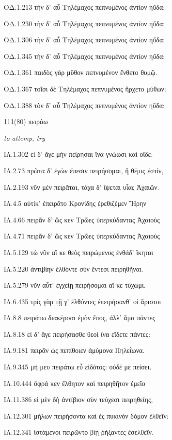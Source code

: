 \begin{enumerate}
{ΟΔ.1.213 τὴν δ' αὖ Τηλέμαχος πεπνυμένος ἀντίον ηὔδα:

ΟΔ.1.230 τὴν δ' αὖ Τηλέμαχος πεπνυμένος ἀντίον ηὔδα:

ΟΔ.1.306 τὴν δ' αὖ Τηλέμαχος πεπνυμένος ἀντίον ηὔδα:

ΟΔ.1.345 τὴν δ' αὖ Τηλέμαχος πεπνυμένος ἀντίον ηὔδα:

ΟΔ.1.361 παιδὸς γὰρ μῦθον πεπνυμένον ἔνθετο θυμῷ.

ΟΔ.1.367 τοῖσι δὲ Τηλέμαχος πεπνυμένος ἤρχετο μύθων:

ΟΔ.1.388 τὸν δ' αὖ Τηλέμαχος πεπνυμένος ἀντίον ηὔδα:

}

\clearpage
\item[\large 111(80)]{\large \g πειράω}

\hspace{0.2cm} \textit{ to attemp, try }

{\g
ΙΛ.1.302 εἰ δ' ἄγε μὴν πείρησαι ἵνα γνώωσι καὶ οἵδε:

ΙΛ.2.73 πρῶτα δ' ἐγὼν ἔπεσιν πειρήσομαι, ἣ θέμις ἐστίν,

ΙΛ.2.193 νῦν μὲν πειρᾶται, τάχα δ' ἴψεται υἷας Ἀχαιῶν.

ΙΛ.4.5 αὐτίκ' ἐπειρᾶτο Κρονίδης ἐρεθιζέμεν Ἥρην

ΙΛ.4.66 πειρᾶν δ' ὥς κεν Τρῶες ὑπερκύδαντας Ἀχαιοὺς

ΙΛ.4.71 πειρᾶν δ' ὥς κεν Τρῶες ὑπερκύδαντας Ἀχαιοὺς

ΙΛ.5.129 τὼ νῦν αἴ κε θεὸς πειρώμενος ἐνθάδ' ἵκηται

ΙΛ.5.220 ἀντιβίην ἐλθόντε σὺν ἔντεσι πειρηθῆναι.

ΙΛ.5.279 νῦν αὖτ' ἐγχείῃ πειρήσομαι αἴ κε τύχωμι.

ΙΛ.6.435 τρὶς γὰρ τῇ γ' ἐλθόντες ἐπειρήσανθ' οἱ ἄριστοι

ΙΛ.8.8 πειράτω διακέρσαι ἐμὸν ἔπος, ἀλλ' ἅμα πάντες

ΙΛ.8.18 εἰ δ' ἄγε πειρήσασθε θεοὶ ἵνα εἴδετε πάντες:

ΙΛ.9.181 πειρᾶν ὡς πεπίθοιεν ἀμύμονα Πηλεΐωνα.

ΙΛ.9.345 μή μευ πειράτω εὖ εἰδότος: οὐδέ με πείσει.

ΙΛ.10.444 ὄφρά κεν ἔλθητον καὶ πειρηθῆτον ἐμεῖο

ΙΛ.11.386 εἰ μὲν δὴ ἀντίβιον σὺν τεύχεσι πειρηθείης,

ΙΛ.12.301 μήλων πειρήσοντα καὶ ἐς πυκινὸν δόμον ἐλθεῖν:

ΙΛ.12.341 ἱστάμενοι πειρῶντο βίῃ ῥήξαντες ἐσελθεῖν.

}
\end{enumerate}
